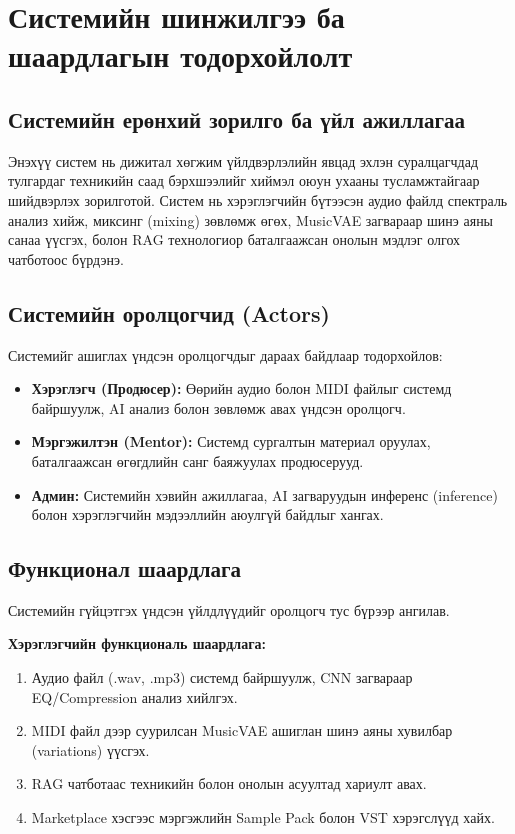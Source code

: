 
\chapter{Системийн шинжилгээ ба шаардлагын тодорхойлолт}
\label{Chapter2}

\section{Системийн ерөнхий зорилго ба үйл ажиллагаа}
Энэхүү систем нь дижитал хөгжим үйлдвэрлэлийн явцад эхлэн суралцагчдад тулгардаг техникийн саад бэрхшээлийг хиймэл оюун ухааны тусламжтайгаар шийдвэрлэх зорилготой. Систем нь хэрэглэгчийн бүтээсэн аудио файлд спектраль анализ хийж, миксинг (mixing) зөвлөмж өгөх, MusicVAE загвараар шинэ аяны санаа үүсгэх, болон RAG технологиор баталгаажсан онолын мэдлэг олгох чатботоос бүрдэнэ.

\section{Системийн оролцогчид (Actors)}
Системийг ашиглах үндсэн оролцогчдыг дараах байдлаар тодорхойлов:
\begin{itemize}
    \item \textbf{Хэрэглэгч (Продюсер):} Өөрийн аудио болон MIDI файлыг системд байршуулж, AI анализ болон зөвлөмж авах үндсэн оролцогч.
    \item \textbf{Мэргэжилтэн (Mentor):} Системд сургалтын материал оруулах, баталгаажсан өгөгдлийн санг баяжуулах продюсерууд.
    \item \textbf{Админ:} Системийн хэвийн ажиллагаа, AI загваруудын инференс (inference) болон хэрэглэгчийн мэдээллийн аюулгүй байдлыг хангах.
\end{itemize}

\section{Функционал шаардлага}
Системийн гүйцэтгэх үндсэн үйлдлүүдийг оролцогч тус бүрээр ангилав.

\textbf{Хэрэглэгчийн функциональ шаардлага:}
\begin{enumerate}
    \item Аудио файл (.wav, .mp3) системд байршуулж, CNN загвараар EQ/Compression анализ хийлгэх.
    \item MIDI файл дээр суурилсан MusicVAE ашиглан шинэ аяны хувилбар (variations) үүсгэх.
    \item RAG чатботаас техникийн болон онолын асуултад хариулт авах.
    \item Marketplace хэсгээс мэргэжлийн Sample Pack болон VST хэрэгслүүд хайх.
\end{enumerate}

